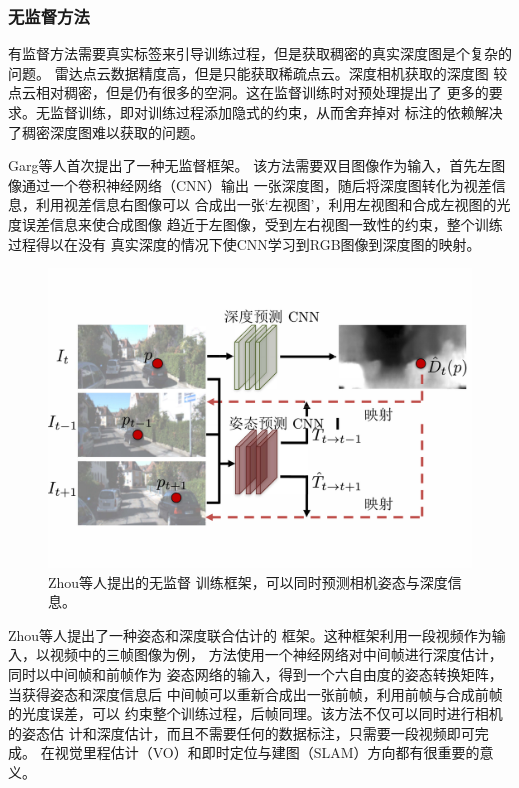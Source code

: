 \subsubsection{无监督方法}

有监督方法需要真实标签来引导训练过程，但是获取稠密的真实深度图是个复杂的问题。
雷达点云数据精度高，但是只能获取稀疏点云。深度相机获取的深度图
较点云相对稠密，但是仍有很多的空洞。这在监督训练时对预处理提出了
更多的要求。无监督训练，即对训练过程添加隐式的约束，从而舍弃掉对
标注的依赖解决了稠密深度图难以获取的问题。

Garg等人\cite{garg2016unsupervised}首次提出了一种无监督框架。
该方法需要双目图像作为输入，首先左图像通过一个卷积神经网络（CNN）输出
一张深度图，随后将深度图转化为视差信息，利用视差信息右图像可以
合成出一张‘左视图’，利用左视图和合成左视图的光度误差信息来使合成图像
趋近于左图像，受到左右视图一致性的约束，整个训练过程得以在没有
真实深度的情况下使CNN学习到RGB图像到深度图的映射。
\begin{figure}[htb]
    \centering
    \includegraphics[width=0.9\linewidth]{figure/Sfm.pdf}
    \caption{Zhou等人\cite{zhou2017unsupervised}提出的无监督
    训练框架，可以同时预测相机姿态与深度信息。}
    \label{sfm_zhou}
\end{figure}

Zhou等人\cite{zhou2017unsupervised}提出了一种姿态和深度联合估计的
框架。这种框架利用一段视频作为输入，以视频中的三帧图像为例，
方法使用一个神经网络对中间帧进行深度估计，同时以中间帧和前帧作为
姿态网络的输入，得到一个六自由度的姿态转换矩阵，当获得姿态和深度信息后
中间帧可以重新合成出一张前帧，利用前帧与合成前帧的光度误差，可以
约束整个训练过程，后帧同理。该方法不仅可以同时进行相机的姿态估
计和深度估计，而且不需要任何的数据标注，只需要一段视频即可完成。
在视觉里程估计（VO）和即时定位与建图（SLAM）方向都有很重要的意义。

